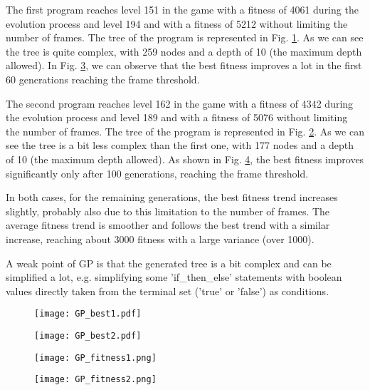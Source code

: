 The first program reaches level 151 in the
game with a fitness of 4061 during the evolution process and level 194 and with a fitness of 5212
without limiting the number of frames. The tree of the program is represented in Fig. \ref{fig:GP_best1}. As
we can see the tree is quite complex, with 259 nodes and a depth of 10 (the maximum depth
allowed). In Fig. \ref{fig:GP_fitness1}, we can observe that the best fitness improves a lot in the first 60
generations reaching the frame threshold.

The second program reaches level 162 in the game with a fitness of 4342 during the evolution process and 
level 189 and with a fitness of 5076 without limiting the number of frames. The tree of the program is 
represented in Fig. \ref{fig:GP_best2}. As we can see the tree is a bit less complex than the first one, with 177 nodes 
and a depth of 10 (the maximum depth allowed). As shown in Fig. \ref{fig:GP_fitness2}, the best fitness improves significantly 
only after 100 generations, reaching the frame threshold.

In both cases, for the remaining generations, the best fitness trend increases slightly, probably also due 
to this limitation to the number of frames. The average fitness trend is smoother and follows the best trend 
with a similar increase, reaching about 3000 fitness with a large variance (over 1000).

A weak point of GP is that the generated tree is a bit complex and can be simplified a lot,
e.g. simplifying some 'if\_then\_else' statements with boolean values directly taken from the
terminal set ('true' or 'false') as conditions.

\begin{figure*}[t!]
    \centering
    \begin{subfigure}[b]{0.45\textwidth}
        \centering
        \texttt{[image: GP\_best1.pdf]}
        \caption{}
        \label{fig:GP_best1}
    \end{subfigure}
    \hspace{1mm}
    \begin{subfigure}[b]{0.45\textwidth}
        \centering
        \texttt{[image: GP\_best2.pdf]}
        \caption{}
        \label{fig:GP_best2}
    \end{subfigure}
       \caption{Best tree-based programs generated by GP.}
       \label{fig:GP_best}
\end{figure*}


\begin{figure*}[t!]
    \centering
    \begin{subfigure}[b]{0.45\textwidth}
        \centerline{\texttt{[image: GP\_fitness1.png]}}
        \caption{}
        \label{fig:GP_fitness1}
    \end{subfigure}
    \hfill
    \begin{subfigure}[b]{0.45\textwidth}
        \centerline{\texttt{[image: GP\_fitness2.png]}}
        \caption{}
        \label{fig:GP_fitness2}
    \end{subfigure}
       \caption{Fitness trend of the GP runs that have generated the best programs.}
       \label{fig:GP_fitness}
\end{figure*}

